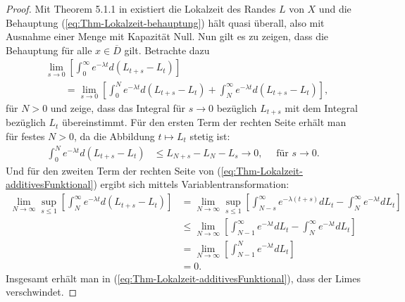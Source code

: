\documentclass[10pt, a4paper, leqno, twoside, bibliography=totocnumbered, final]{scrartcl}
\theoremstyle{definition}
\theoremstyle{plain}%
\theoremstyle{remark}
\begin{document}
\begin{proof}
Mit Theorem 5.1.1 in \cite{Fukushima} existiert die Lokalzeit des Randes $ L $ von $ X $ und die Behauptung (\ref{eq:Thm-Lokalzeit-behauptung}) hält quasi überall, also mit Ausnahme einer Menge mit Kapazität Null. Nun gilt es zu zeigen, dass die Behauptung für alle $ x \in \overline{D} $ gilt. Betrachte dazu
\begin{equation}
\label{eq:Thm-Lokalzeit-additivesFunktional}
\begin{aligned}
& \lim_{s \to 0} \left[  \int_0^{\infty} e^{-\lambda t} d(L_{t+s} -L_t)  \right] \\
& \qquad = \lim_{s \to 0} \left[  \int_0^{N} e^{-\lambda t} d(L_{t+s} -L_t) + \int_N^{\infty} e^{-\lambda t} d(L_{t+s} -L_t) \right],
\end{aligned}
\end{equation}
für $ N>0 $ und zeige, dass das Integral für $ s \to 0 $ bezüglich $ L_{t+s} $ mit dem Integral bezüglich $ L_t $ übereinstimmt.
Für den ersten Term der rechten Seite erhält man für festes $ N>0 $, da die Abbildung $ t \mapsto L_t $ stetig ist:
\begin{equation*}
\begin{aligned}
\int_0^{N} e^{-\lambda t} d(L_{t+s} -L_t) & \leq L_{N+s} -L_N - L_s  \to  0, \quad \text{ für }  s \to 0 .
\end{aligned}
\end{equation*}
Und für den zweiten Term der rechten Seite von (\ref{eq:Thm-Lokalzeit-additivesFunktional}) ergibt sich mittels Variablentransformation:
\begin{equation*}
\begin{aligned}
\lim_{N \to \infty} \sup_{s \leq 1} \left[ \int_N^{\infty} e^{-\lambda t} d(L_{t+s} -L_t) \right] & = \lim_{N \to \infty} \sup_{s \leq 1} \left[ \int_{N-s}^{\infty} e^{-\lambda (t+s)} dL_{t} - \int_{N}^{\infty} e^{-\lambda t} dL_{t} \right] \\
& \leq  \lim_{N \to \infty}  \left[ \int_{N-1}^{\infty} e^{-\lambda t} dL_{t} - \int_{N}^{\infty} e^{-\lambda t} dL_{t} \right] \\
& = \lim_{N \to \infty}  \left[ \int_{N-1}^{N} e^{-\lambda t} dL_{t} \right] \\
& = 0.
\end{aligned}
\end{equation*}
Insgesamt erhält man in (\ref{eq:Thm-Lokalzeit-additivesFunktional}), dass der Limes verschwindet.


\end{proof}
\end{document}
